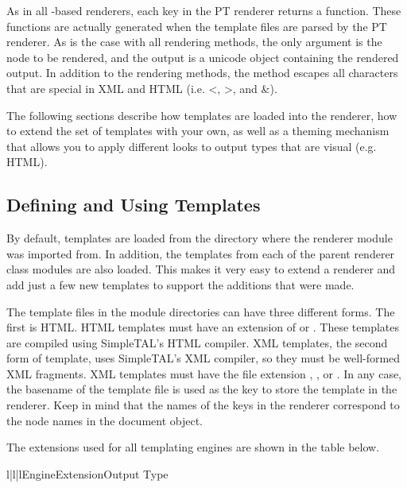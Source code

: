 As in all -based renderers, each key in the PT renderer
returns a function.  These functions are actually generated when the 
template files are parsed by the PT renderer.
As is the case with all rendering methods, the only argument is the node to be
rendered, and the output is a unicode object containing the rendered 
output. In addition to the rendering methods, the  method
escapes all characters that are special in XML and HTML (i.e. <, >, and \&).

The following sections describe how templates are loaded into the 
renderer, how to extend the set of templates with your own, as well
as a theming mechanism that allows you to apply different looks to 
output types that are visual (e.g. HTML).

\subsection{Defining and Using Templates}


By default, templates are loaded from the directory where the 
renderer module was imported from.  In addition, the templates from
each of the parent renderer class modules are also loaded.  This makes
it very easy to extend a renderer and add just a few new templates
to support the additions that were made.

The template files in the module directories can have three different forms.
The first is HTML.  HTML templates must have an extension of  or
 .  These templates are compiled using 
SimpleTAL's HTML compiler.  XML templates, the second form of template, 
uses SimpleTAL's XML compiler, so they must be well-formed XML 
fragments.  XML templates must have the file extension , 
, or .  In any case, the basename of the template
file is used as the key to store the template in the renderer.  Keep in
mind that the names of the keys in the renderer correspond to the node
names in the document object.  

The extensions used for all templating engines are shown in the table below.
\begin{tableiii}{l|l|l}{}{Engine}{Extension}{Output Type}
\end{tableiii} 

